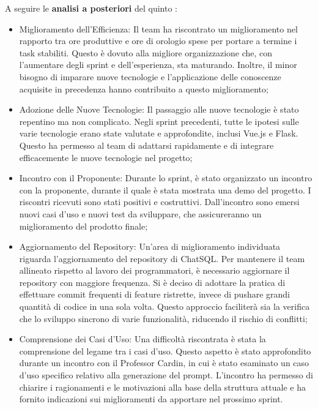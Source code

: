 \vspace{0.5\baselineskip}
\par A seguire le \textbf{analisi a posteriori} del quinto :
\begin{itemize}
  \item Miglioramento dell'Efficienza: Il team ha riscontrato un miglioramento nel rapporto tra ore produttive e ore di orologio spese per portare a termine i task stabiliti. Questo è dovuto alla migliore organizzazione che, con l'aumentare degli sprint e dell'esperienza, sta maturando. Inoltre, il minor bisogno di imparare nuove tecnologie e l'applicazione delle conoscenze acquisite in precedenza hanno contribuito a questo miglioramento;
  \item Adozione delle Nuove Tecnologie: Il passaggio alle nuove tecnologie è stato repentino ma non complicato. Negli sprint precedenti, tutte le ipotesi sulle varie tecnologie erano state valutate e approfondite, inclusi Vue.js e Flask. Questo ha permesso al team di adattarsi rapidamente e di integrare efficacemente le nuove tecnologie nel progetto;
  \item Incontro con il Proponente: Durante lo sprint, è stato organizzato un incontro con la proponente, durante il quale è stata mostrata una demo del progetto. I riscontri ricevuti sono stati positivi e costruttivi. Dall'incontro sono emersi nuovi casi d'uso e nuovi test da sviluppare, che assicureranno un miglioramento del prodotto finale;
  \item Aggiornamento del Repository: Un'area di miglioramento individuata riguarda l'aggiornamento del repository di ChatSQL. Per mantenere il team allineato rispetto al lavoro dei programmatori, è necessario aggiornare il repository con maggiore frequenza. Si è deciso di adottare la pratica di effettuare commit frequenti di feature ristrette, invece di pushare grandi quantità di codice in una sola volta. Questo approccio faciliterà sia la verifica che lo sviluppo sincrono di varie funzionalità, riducendo il rischio di conflitti;
  \item Comprensione dei Casi d'Uso: Una difficoltà riscontrata è stata la comprensione del legame tra i casi d'uso. Questo aspetto è stato approfondito durante un incontro con il Professor Cardin, in cui è stato esaminato un caso d'uso specifico relativo alla generazione del prompt. L'incontro ha permesso di chiarire i ragionamenti e le motivazioni alla base della struttura attuale e ha fornito indicazioni sui miglioramenti da apportare nel prossimo sprint.
\end{itemize}

